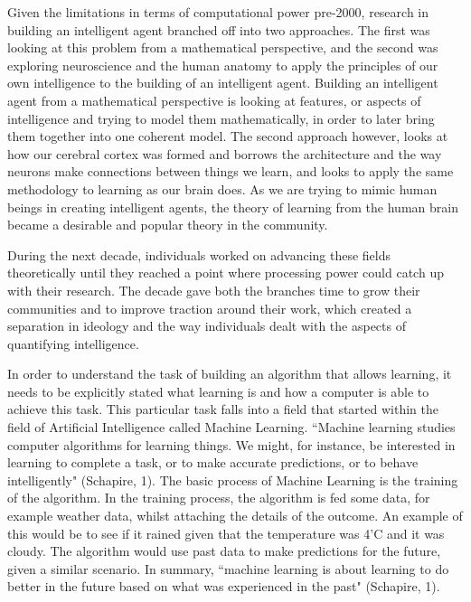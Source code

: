 \documentclass[11pt, oneside]{article}
\begin{document}
\par Given the limitations in terms of computational power pre-2000, research in building an intelligent agent branched off into two approaches. The first was looking at this problem from a mathematical perspective, and the second was exploring neuroscience and the human anatomy to apply the principles of our own intelligence to the building of an intelligent agent. Building an intelligent agent from a mathematical perspective is looking at features, or aspects of intelligence and trying to model them mathematically, in order to later bring them together into one coherent model. The second approach however, looks at how our cerebral cortex was formed and borrows the architecture and the way neurons make connections between things we learn, and looks to apply the same methodology to learning as our brain does. As we are trying to mimic human beings in creating intelligent agents, the theory of learning from the human brain became a desirable and popular theory in the community. 

\par During the next decade, individuals worked on advancing these fields theoretically until they reached a point where processing power could catch up with their research. The decade gave both the branches time to grow their communities and to improve traction around their work, which created a separation in ideology and the way individuals dealt with the aspects of quantifying intelligence. 

\par In order to understand the task of building an algorithm that allows learning, it needs to be explicitly stated what learning is and how a computer is able to achieve this task. This particular task falls into a field that started within the field of Artificial Intelligence called Machine Learning. ``Machine learning studies computer algorithms for learning things. We might, for instance, be interested in learning to complete a task, or to make accurate predictions, or to behave intelligently" (Schapire, 1). The basic process of Machine Learning is the training of the algorithm. In the training process, the algorithm is fed some data, for example weather data, whilst attaching the details of the outcome. An example of this would be to see if it rained given that the temperature was 4'C and it was cloudy. The algorithm would use past data to make predictions for the future, given a similar scenario. In summary, ``machine learning is about learning to do better in the future based on what was experienced in the past" (Schapire, 1).
\end{document}
